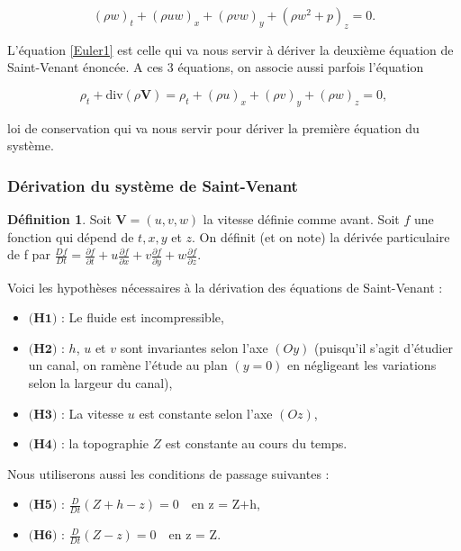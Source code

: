 \documentclass[
11pt, %
francais, %
singlespacing, %
headsepline, %
]{MastersDoctoralThesis} %
\theoremstyle{definition}
\newtheorem{definition}{Définition}
\begin{document}
\begin{equation} (\rho w)_{t} + (\rho u w)_{x}+(\rho vw)_{y}+(\rho w^{2}+p)_{z} =0.\label{Euler3}\end{equation}

L'équation \eqref{Euler1} est celle qui va nous servir à dériver la deuxième équation de Saint-Venant énoncée. A ces 3 équations, on associe aussi parfois l'équation 

\begin{equation} \rho_{t}+\text{div}(\rho\textbf{V})=\rho_{t} + (\rho u)_{x}+(\rho v)_{y}+(\rho w)_{z} =0, \label{Euler0} \end{equation}

loi de conservation qui va nous servir pour dériver la première équation du système.

\subsubsection{Dérivation du système de Saint-Venant}

\begin{definition}
Soit $\textbf{V}=(u,v,w)$ la vitesse définie comme avant. Soit $f$ une fonction qui dépend de $t,x,y$ et $z$.
On définit (et on note) la dérivée particulaire de f par 
$\frac{Df}{Dt} = \frac{\partial f}{\partial t}+u\frac{\partial f}{\partial x}+v\frac{\partial f}{\partial y}+w\frac{\partial f}{\partial z}.$
\end{definition}


Voici les hypothèses nécessaires à la dérivation des équations de Saint-Venant :

\begin{itemize}
\item $\textbf{(H1)}$ : Le fluide est incompressible,
\item $\textbf{(H2)}$ : $h$, $u$ et $v$ sont invariantes selon l'axe $(Oy)$ (puisqu'il s'agit d'étudier un canal, on ramène l'étude au plan $(y=0)$ en négligeant les variations selon la largeur du canal),
\item $\textbf{(H3)}$  : La vitesse $u$ est constante selon l'axe $(Oz)$,
\item $\textbf{(H4)}$ : la topographie $Z$ est constante au cours du temps.
\end{itemize}

Nous utiliserons aussi les conditions de passage suivantes :

\begin{itemize}
\item $\textbf{(H5)}$ : $\frac{D}{Dt} (Z+h-z) = 0 \quad \text{en z = Z+h}$,
\item $\textbf{(H6)}$ : $\frac{D}{Dt} (Z-z) = 0 \quad \text{en z = Z}$.
\end{itemize}
\end{document}
